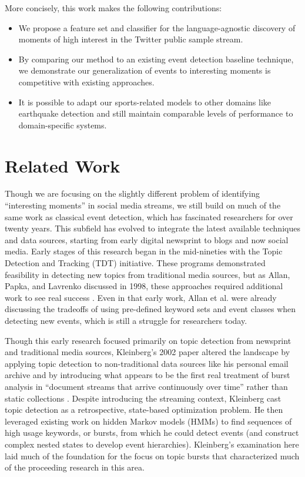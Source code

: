 \documentclass{sig-alternate}
\begin{document}
More concisely, this work makes the following contributions:
%
\begin{itemize}
\item We propose a feature set and classifier for the language-agnostic discovery of moments of high interest in the Twitter public sample stream.
\item By comparing our method to an existing event detection baseline technique, we demonstrate our generalization of events to interesting moments is competitive with existing approaches.
\item It is possible to adapt our sports-related models to other domains like earthquake detection and still maintain comparable levels of performance to domain-specific systems.
\end{itemize}

\section{Related Work}
\label{sect:relatedWork}

Though we are focusing on the slightly different problem of identifying ``interesting moments'' in social media streams, we still build on much of the same work as classical event detection, which has fascinated researchers for over twenty years.
This subfield has evolved to integrate the latest available techniques and data sources, starting from early digital newsprint to blogs and now social media.
Early stages of this research began in the mid-nineties with the Topic Detection and Tracking (TDT) initiative.
These programs demonstrated feasibility in detecting new topics from traditional media sources, but as Allan, Papka, and Lavrenko discussed in 1998, these approaches required additional work to see real success \cite{allan1998line}.
Even in that early work, Allan et al. were already discussing the tradeoffs of using pre-defined keyword sets and event classes when detecting new events, which is still a struggle for researchers today.

Though this early research focused primarily on topic detection from newsprint and traditional media sources, Kleinberg's 2002 paper altered the landscape by applying topic detection to non-traditional data sources like his personal email archive and by introducing what appears to be the first real treatment of burst analysis in ``document streams that arrive continuously over time'' rather than  static collections \cite{Kleinberg:2002:BHS:775047.775061}. 
Despite introducing the streaming context, Kleinberg cast topic detection as a retrospective, state-based optimization problem.
He then leveraged existing work on hidden Markov models (HMMs) to find sequences of high usage keywords, or bursts, from which he could detect events (and construct complex nested states to develop event hierarchies).
Kleinberg's examination here laid much of the foundation for the focus on topic bursts that characterized much of the proceeding research in this area.
\end{document}
